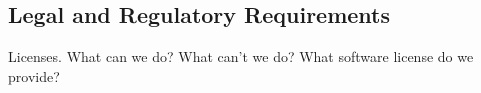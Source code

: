 \documentclass[12pt]{article}
\begin{document}
\subsection{Legal and Regulatory Requirements}
Licenses. What can we do? What can't we do? What software license do we provide?














\end{document}
